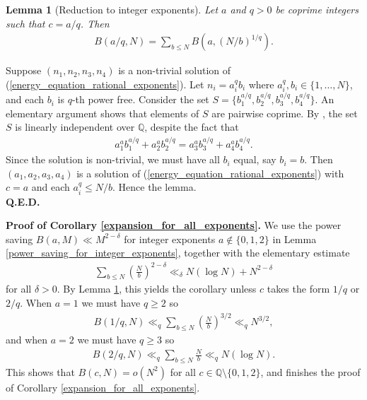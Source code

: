 \documentclass[9pt]{amsart}
\theoremstyle{my_theorem_style}
\numberwithin{definition}{section}
\newtheorem{lemma}[definition]{Lemma}
\renewenvironment{proof}{\noindent {\textbf{Proof.}}}{\\\textbf{Q.E.D.}}
\newcommand{\Q}{\mathbb{Q}}
\begin{document}
\begin{lemma}
[Reduction to integer exponents]
\label{reduction_to_integer_case}
    Let $a$ and $q > 0$ be coprime integers such that $c = a/q$. Then
    \begin{align*}
        B(a/q, N) = \sum_{b \leq N}
        B(a, (N/b)^{1/q}).
    \end{align*}
\end{lemma}
\begin{proof}
    Suppose $(n_1, n_2, n_3, n_4)$ is a non-trivial solution of (\ref{energy_equation_rational_exponents}). Let $n_i = a_i^q b_i$ where $a_i^q, b_i \in \{1, \dots, N\}$, and each $b_i$ is $q$-th power free. Consider the set $S = \{b_1^{a/q}, b_2^{a/q}, b_3^{a/q}, b_4^{a/q}\}$. An elementary argument shows that elements of $S$ are pairwise coprime. By \cite[Theorem 1.1]{Carr--O'Sullivan_on_the_linear_independence_of_roots}, the set $S$ is linearly independent over $\Q$, despite the fact that
    \begin{align*}
        a_1^a b_1^{a/q} + a_2^a b_2^{a/q} = a_3^a b_3^{a/q} + a_4^a b_4^{a/q}.
    \end{align*}
    Since the solution is non-trivial, we must have all $b_i$ equal, say $b_i = b$. Then $(a_1, a_2, a_3, a_4)$ is a solution of (\ref{energy_equation_rational_exponents}) with $c = a$ and each $a_i^q \leq N/b$. Hence the lemma.
\end{proof}

\noindent\textbf{Proof of Corollary \ref{expansion_for_all_exponents}.}
We use the power saving $B(a, M) \ll M^{2 - \delta}$ for integer exponents $a \not \in \{0, 1, 2\}$ in Lemma \ref{power_saving_for_integer_exponents}, together with the elementary estimate
\begin{align*}
    \sum_{b \leq N} \left(\frac{N}{b}\right)^{2 - \delta} \ll_\delta
    N(\log{N}) + N^{2 - \delta}
\end{align*}
for all $\delta > 0$. By Lemma \ref{reduction_to_integer_case}, this yields the corollary unless $c$ takes the form $1/q$ or $2/q$. When $a = 1$ we must have $q \geq 2$ so
\begin{align*}
    B(1/q, N) \ll_q \sum_{b \leq N} \left(\frac{N}{b}\right)^{3/2}
    \ll_q N^{3/2},
\end{align*}
and when $a = 2$ we must have $q \geq 3$ so
\begin{align*}
    B(2/q, N) \ll_q \sum_{b \leq N} \frac{N}{b} \ll_q N(\log{N}).
\end{align*}
This shows that $B(c, N) = o(N^2)$ for all $c \in \Q \setminus \{0, 1, 2\}$, and finishes the proof of Corollary \ref{expansion_for_all_exponents}.

\clearpage




\end{document}
